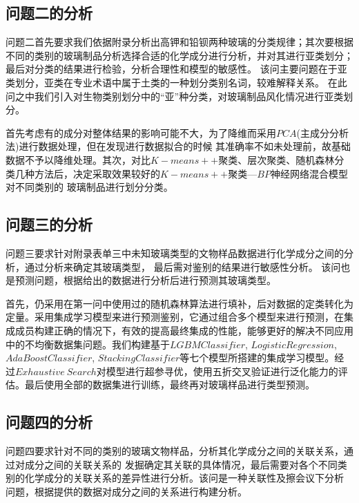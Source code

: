 \documentclass[UTF8]{ctexart}
\begin{document}
            \subsection{问题二的分析}
            问题二首先要求我们依据附录分析出高钾和铅钡两种玻璃的分类规律；其次要根据不同的类别的玻璃制品分析选择合适的化学成分进行分析，并对其进行亚类划分；
            最后对分类的结果进行检验，分析合理性和模型的敏感性。 该问主要问题在于亚类划分，亚类在专业术语中属于土类的一种划分类别名词，较难解释关系。
            在此问之中我们引入对生物类别划分中的“亚”种分类，对玻璃制品风化情况进行亚类划分。

            首先考虑有的成分对整体结果的影响可能不大，为了降维而采用$PCA$(主成分分析法)进行数据处理，但在发现进行数据拟合的时候
            其准确率不如未处理前，故基础数据不予以降维处理。其次，对比$K-means++$聚类、层次聚类、随机森林分类几种方法后，决定采取效果较好的$K-means++$聚类—$BP$神经网络混合模型对不同类别的
            玻璃制品进行划分分类。



            \subsection{问题三的分析}
            问题三要求针对附录表单三中未知玻璃类型的文物样品数据进行化学成分之间的分析，通过分析来确定其玻璃类型，
            最后需对鉴别的结果进行敏感性分析。 该问也是预测问题，根据给出的数据进行分析后进行预测其玻璃类型。

            首先，仍采用在第一问中使用过的随机森林算法进行填补，后对数据的定类转化为定量。采用集成学习模型来进行预测鉴别，它通过组合多个模型来进行预测，在集成成员构建正确的情况下，有效的提高最终集成的性能，能够更好的解决不同应用中的不均衡数据集问题。我们构建基于$LGBMClassifier$, $LogisticRegression$, $AdaBoostClassifier$, $StackingClassifier$等七个模型所搭建的集成学习模型。经过$Exhaustive\ Search$对模型进行超参寻优，使用五折交叉验证进行泛化能力的评估。最后使用全部的数据集进行训练，最终再对玻璃样品进行类型预测。


            \subsection{问题四的分析}
            问题四要求针对不同的类别的玻璃文物样品，分析其化学成分之间的关联关系，通过对成分之间的关联关系的
            发掘确定其关联的具体情况，最后需要对各个不同类别的化学成分的关联关系的差异性进行分析。该问是一种关联性及擦会议下分析
            问题，根据提供的数据对成分之间的关系进行构建分析。
\end{document}
